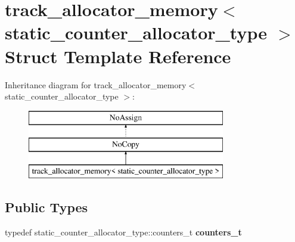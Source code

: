 \hypertarget{structtrack__allocator__memory}{}\section{track\+\_\+allocator\+\_\+memory$<$ static\+\_\+counter\+\_\+allocator\+\_\+type $>$ Struct Template Reference}
\label{structtrack__allocator__memory}
Inheritance diagram for track\+\_\+allocator\+\_\+memory$<$ static\+\_\+counter\+\_\+allocator\+\_\+type $>$\+:\begin{figure}[H]
\begin{center}
\leavevmode
\includegraphics[height=3.000000cm]{structtrack__allocator__memory}
\end{center}
\end{figure}
\subsection*{Public Types}
\begin{DoxyCompactItemize}
\item 
\hypertarget{structtrack__allocator__memory_af1f08aa48ec596616909e1ca32d5fe26}{}typedef static\+\_\+counter\+\_\+allocator\+\_\+type\+::counters\+\_\+t {\bfseries counters\+\_\+t}\label{structtrack__allocator__memory_af1f08aa48ec596616909e1ca32d5fe26}

\end{DoxyCompactItemize}
